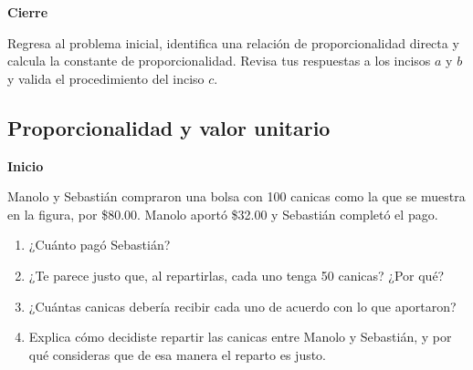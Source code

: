 \documentclass[11pt]{book}
\begin{document}
\begin{boxK}
  \begin{center}\textbf{Cierre}\end{center}
  Regresa al problema inicial, identifica una relación de proporcionalidad directa y calcula
  la constante de proporcionalidad.
  Revisa tus respuestas a los incisos $a$ y $b$ y valida el procedimiento del inciso $c$.
\end{boxK}
\newpage
\subsection{Proporcionalidad y valor unitario}

\begin{boxK}
  \begin{center}\textbf{Inicio}\end{center}
  Manolo y Sebastián compraron una bolsa con 100 canicas como la que se muestra en la
  figura, por \$80.00. Manolo aportó \$32.00 y Sebastián completó el pago.
  \begin{enumerate}
    \item ¿Cuánto pagó Sebastián?
    \item ¿Te parece justo que, al repartirlas, cada uno tenga 50 canicas? ¿Por qué?
    \item ¿Cuántas canicas debería recibir cada uno de acuerdo con lo que aportaron?
    \item Explica cómo decidiste repartir las canicas entre Manolo y Sebastián, y por qué
          consideras que de esa manera el reparto es justo.
  \end{enumerate}
\end{boxK}
\end{document}
